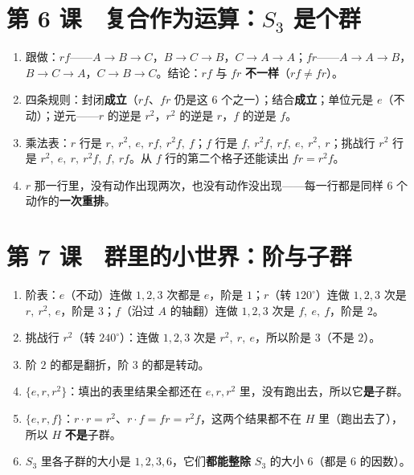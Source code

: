 \section*{第 6 课　复合作为运算：\(S_3\) 是个群}
\begin{enumerate}
  \item 跟做：\(rf\)——\(A\to B\to C\)，\(B\to C\to B\)，\(C\to A\to A\)；\(fr\)——\(A\to A\to B\)，\(B\to C\to A\)，\(C\to B\to C\)。结论：\(rf\) 与 \(fr\) \textbf{不一样}（\(rf\neq fr\)）。
  \item 四条规则：封闭\textbf{成立}（\(rf\)、\(fr\) 仍是这 \(6\) 个之一）；结合\textbf{成立}；单位元是 \(e\)（不动）；逆元——\(r\) 的逆是 \(r^2\)，\(r^2\) 的逆是 \(r\)，\(f\) 的逆是 \(f\)。
  \item 乘法表：\(r\) 行是 \(r,\ r^2,\ e,\ rf,\ r^2f,\ f\)；\(f\) 行是 \(f,\ r^2f,\ rf,\ e,\ r^2,\ r\)；挑战行 \(r^2\) 行是 \(r^2,\ e,\ r,\ r^2f,\ f,\ rf\)。从 \(f\) 行的第二个格子还能读出 \(fr=r^2f\)。
  \item \(r\) 那一行里，没有动作出现两次，也没有动作没出现——每一行都是同样 \(6\) 个动作的\textbf{一次重排}。
\end{enumerate}

\section*{第 7 课　群里的小世界：阶与子群}
\begin{enumerate}
  \item 阶表：\(e\)（不动）连做 \(1,2,3\) 次都是 \(e\)，阶是 \(1\)；\(r\)（转 \(120^\circ\)）连做 \(1,2,3\) 次是 \(r,\ r^2,\ e\)，阶是 \(3\)；\(f\)（沿过 \(A\) 的轴翻）连做 \(1,2,3\) 次是 \(f,\ e,\ f\)，阶是 \(2\)。
  \item 挑战行 \(r^2\)（转 \(240^\circ\)）：连做 \(1,2,3\) 次是 \(r^2,\ r,\ e\)，所以阶是 \textbf{\(3\)}（不是 \(2\)）。
  \item 阶 \(2\) 的都是翻折，阶 \(3\) 的都是转动。
  \item \(\{e,r,r^2\}\)：填出的表里结果全都还在 \(e,r,r^2\) 里，没有跑出去，所以它\textbf{是}子群。
  \item \(\{e,r,f\}\)：\(r\cdot r=r^2\)、\(r\cdot f=fr=r^2f\)，这两个结果都不在 \(H\) 里（跑出去了），所以 \(H\) \textbf{不是}子群。
  \item \(S_3\) 里各子群的大小是 \(1,2,3,6\)，它们\textbf{都能整除} \(S_3\) 的大小 \(6\)（都是 \(6\) 的因数）。
\end{enumerate}

